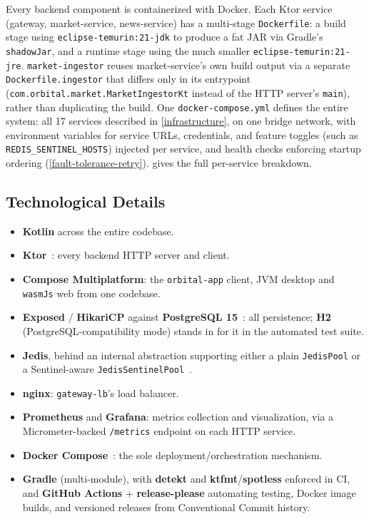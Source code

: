 \documentclass{scrartcl}
\begin{document}
Every backend component is containerized with Docker. Each Ktor service (gateway, market-service,
news-service) has a multi-stage \texttt{Dockerfile}: a build stage using
\texttt{eclipse-temurin:21-jdk} to produce a fat JAR via Gradle's \texttt{shadowJar}, and a
runtime stage using the much smaller \texttt{eclipse-temurin:21-jre}. \texttt{market-ingestor}
reuses market-service's own build output via a separate \texttt{Dockerfile.ingestor} that differs
only in its entrypoint (\texttt{com.orbital.market.MarketIngestorKt} instead of the HTTP server's
\texttt{main}), rather than duplicating the build. One \texttt{docker-compose.yml} defines the
entire system: all 17 services described in \cref{infrastructure}, on one bridge network, with
environment variables for service URLs, credentials, and feature toggles (such as
\texttt{REDIS\_SENTINEL\_HOSTS}) injected per service, and health checks enforcing startup
ordering (\cref{fault-tolerance-retry}).  gives the full per-service breakdown.

\subsection{Technological Details}\label{technological-details}

\begin{itemize}
  \item \textbf{Kotlin} across the entire codebase.
  \item \textbf{Ktor}~\citep{ktor2024docs}: every backend HTTP server and client.
  \item \textbf{Compose Multiplatform}: the \texttt{orbital-app} client, JVM desktop and
  \texttt{wasmJs} web from one codebase.
  \item \textbf{Exposed} / \textbf{HikariCP} against \textbf{PostgreSQL
  15}~\citep{postgresql2024docs}: all persistence; \textbf{H2} (PostgreSQL-compatibility mode)
  stands in for it in the automated test suite.
  \item \textbf{Jedis}, behind an internal abstraction supporting either a plain
  \texttt{JedisPool} or a Sentinel-aware \texttt{JedisSentinelPool}~\citep{redis2024sentinel}.
  \item \textbf{nginx}: \texttt{gateway-lb}'s load balancer.
  \item \textbf{Prometheus} and \textbf{Grafana}: metrics collection and visualization, via a
  Micrometer-backed \texttt{/metrics} endpoint on each HTTP service.
  \item \textbf{Docker Compose}~\citep{docker2024compose}: the sole deployment/orchestration
  mechanism.
  \item \textbf{Gradle} (multi-module), with \textbf{detekt} and \textbf{ktfmt}/\textbf{spotless}
  enforced in CI, and \textbf{GitHub Actions} + \textbf{release-please} automating testing,
  Docker image builds, and versioned releases from Conventional Commit history.
\end{itemize}
\end{document}
